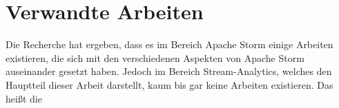\section{Verwandte Arbeiten}

Die Recherche hat ergeben, dass es im Bereich Apache Storm einige Arbeiten existieren, die sich mit den verschiedenen Aspekten von Apache Storm auseinander gesetzt haben. Jedoch im Bereich Stream-Analytics, welches den Hauptteil dieser Arbeit darstellt, kaum bis gar keine Arbeiten existieren. Das heißt die 